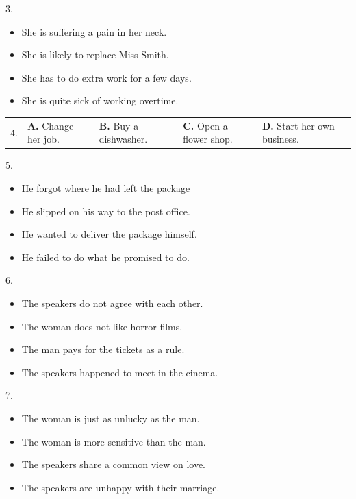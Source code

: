 \documentclass[UTF8,11pt]{ctexart}
\begin{document}
3.


\begin{itemize}[leftmargin=2em,itemsep=.2em,topsep=.4em]\item[A.] She is suffering a pain in her neck.
\item[B.] She is likely to replace Miss Smith.
\item[C.] She has to do extra work for a few days.
\item[D.] She is quite sick of working overtime.
\end{itemize}

\noindent\begin{tabularx}{\linewidth}{@{}lXXXX@{}}4. & \textbf{A.} Change her job. & \textbf{B.} Buy a dishwasher. & \textbf{C.} Open a flower shop. & \textbf{D.} Start her own business.\\\end{tabularx}\par

5.


\begin{itemize}[leftmargin=2em,itemsep=.2em,topsep=.4em]\item[A.] He forgot where he had left the package
\item[B.] He slipped on his way to the post office.
\item[C.] He wanted to deliver the package himself.
\item[D.] He failed to do what he promised to do.
\end{itemize}

6.


\begin{itemize}[leftmargin=2em,itemsep=.2em,topsep=.4em]\item[A.] The speakers do not agree with each other.
\item[B.] The woman does not like horror films.
\item[C.] The man pays for the tickets as a rule.
\item[D.] The speakers happened to meet in the cinema.
\end{itemize}

7.


\begin{itemize}[leftmargin=2em,itemsep=.2em,topsep=.4em]\item[A.] The woman is just as unlucky as the man.
\item[B.] The woman is more sensitive than the man.
\item[C.] The speakers share a common view on love.
\item[D.] The speakers are unhappy with their marriage.
\end{itemize}
\end{document}
